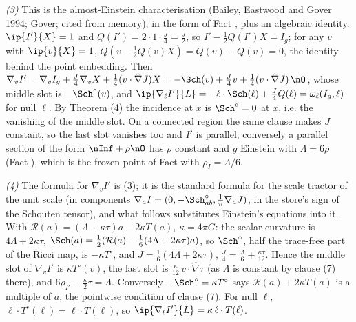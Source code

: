 \emph{(3)} This is the almost-Einstein characterisation (Bailey, Eastwood and Gover 1994; Gover; cited from memory), in the form of Fact , plus an algebraic identity. $\ip{I'}{X} = 1$ and $Q(I') = 2\cdot 1\cdot\tfrac{J}{4} = \tfrac{J}{2}$, so $I' - \tfrac12 Q(I')X = I_{g}$; for any $v$ with $\ip{v}{X} = 1$, $Q(v - \tfrac12 Q(v)X) = Q(v) - Q(v) = 0$, the identity behind the point embedding. Then $\nabla_{v}I' = \nabla_{v}I_{g} + \tfrac{J}{4}\nabla_{v}X + \tfrac14(v\cdot\hat\nabla J)X = -\Sch(v) + \tfrac{J}{4}v + \tfrac14(v\cdot\hat\nabla J)\,\nO$, whose middle slot is $-\Sch^{\circ}(v)$, and $\ip{\nabla_{\ell}I'}{L} = -\ell\cdot\Sch(\ell) + \tfrac{J}{4}Q(\ell) = \omega_{\ell}(I_{g},\ell)$ for null $\ell$. By Theorem (4) the incidence at $x$ is $\Sch^{\circ} = 0$ at $x$, i.e. the vanishing of the middle slot. On a connected region the same clause makes $J$ constant, so the last slot vanishes too and $I'$ is parallel; conversely a parallel section of the form $\nInf + \rho\nO$ has $\rho$ constant and $g$ Einstein with $\Lambda = 6\rho$ (Fact ), which is the frozen point of Fact  with $\rho_{I} = \Lambda/6$.

\emph{(4)} The formula for $\nabla_{v}I'$ is (3); it is the standard formula for the scale tractor of the unit scale (in components $\nabla_{a}I = (0, -\Sch^{\circ}_{ab}, \tfrac{1}{n}\nabla_{a}J)$, in the store's sign of the Schouten tensor), and what follows substitutes Einstein's equations into it. With $\mathcal{R}(a) = (\Lambda + \kappa\tau)a - 2\kappa T(a)$, $\kappa = 4\pi G$: the scalar curvature is $4\Lambda + 2\kappa\tau$, $\Sch(a) = \tfrac12(\mathcal{R}(a) - \tfrac16(4\Lambda + 2\kappa\tau)a)$, so $\Sch^{\circ}$, half the trace-free part of the Ricci map, is $-\kappa T^{\circ}$, and $J = \tfrac16(4\Lambda + 2\kappa\tau)$, $\tfrac{J}{4} = \tfrac{\Lambda}{6} + \tfrac{\kappa\tau}{12}$. Hence the middle slot of $\nabla_{v}I'$ is $\kappa T^{\circ}(v)$, the last slot is $\tfrac{\kappa}{12}\,v\cdot\hat\nabla\tau$ (as $\Lambda$ is constant by clause (7) there), and $6\rho_{I'} - \tfrac{\kappa}{2}\tau = \Lambda$. Conversely $-\Sch^{\circ} = \kappa T^{\circ}$ says $\mathcal{R}(a) + 2\kappa T(a)$ is a multiple of $a$, the pointwise condition of clause (7). For null $\ell$, $\ell\cdot T^{\circ}(\ell) = \ell\cdot T(\ell)$, so $\ip{\nabla_{\ell}I'}{L} = \kappa\,\ell\cdot T(\ell)$.

